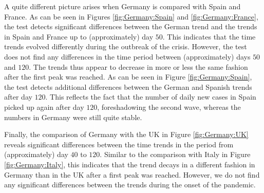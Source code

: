\documentclass[a4paper,12pt]{article}
\numberwithin{equation}{section}
\begin{document}
{\color{red}
A quite different picture arises when Germany is compared with Spain and France. As can be seen in Figures \ref{fig:Germany:Spain} and \ref{fig:Germany:France}, the test detects significant differences between the German trend and the trends in Spain and France up to (approximately) day $50$. This indicates that the time trends evolved differently during the outbreak of the crisis. However, the test does not find any differences in the time period between (approximately) days $50$ and $120$. The trends thus appear to decrease in more or less the same fashion after the first peak was reached. As can be seen in Figure \ref{fig:Germany:Spain}, the test detects additional differences between the German and Spanish trends after day $120$. This reflects the fact that the number of daily new cases in Spain picked up again after day $120$, foreshadowing the second wave, whereas the numbers in Germany were still quite stable. 


Finally, the comparison of Germany with the UK in Figure \ref{fig:Germany:UK} reveals significant differences between the time trends in the period from (approximately) day $40$ to $120$. Similar to the comparison with Italy in Figure \ref{fig:Germany:Italy}, this indicates that the trend decays in a different fashion in Germany than in the UK after a first peak was reached. However, we do not find any significant differences between the trends during the onset of the pandemic.}



\end{document}
